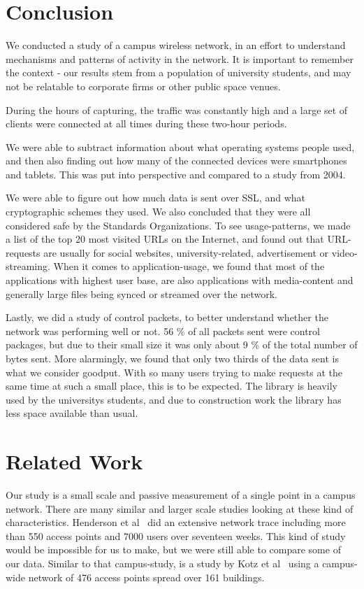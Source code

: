 \documentclass[letterpaper,twocolumn,10pt]{article}
\begin{document}
\section{Conclusion}
We conducted a study of a campus wireless network, in an effort to understand mechanisms and patterns of activity in the network. It is important to remember the context - our results stem from a population of university students, and may not be relatable to corporate firms or other public space venues.

During the hours of capturing, the traffic was constantly high and a large set of clients were connected at all times during these two-hour periods.

We were able to subtract information about what operating systems people used, and then also finding out how many of the connected devices were smartphones and tablets. This was put into perspective and compared to a study from 2004.

We were able to figure out how much data is sent over SSL, and what cryptographic schemes they used. We also concluded that they were all considered safe by the Standards Organizations. To see usage-patterns, we made a list of the top 20 most visited URLs on the Internet, and found out that URL-requests are usually for social websites, university-related, advertisement or video-streaming. When it comes to application-usage, we found that most of the applications with highest user base, are also applications with media-content and generally large files being synced or streamed over the network.

Lastly, we did a study of control packets, to better understand whether the network was performing well or not. 56 \% of all packets sent were control packages, but due to their small size it was only about 9 \% of the total number of bytes sent. More alarmingly, we found that only two thirds of the data sent is what we consider goodput. With so many users trying to make requests at the same time at such a small place, this is to be expected. The library is heavily used by the universitys students, and due to construction work the library has less space available than usual.

\section{Related Work}

Our study is a small scale and passive measurement of a single point in a campus network. There are many similar and larger scale studies looking at these kind of characteristics. Henderson et al~\cite{Campus2004} did an extensive network trace including more than 550 access points and 7000 users over seventeen weeks. This kind of study would be impossible for us to make, but we were still able to compare some of our data. Similar to that campus-study, is a study by Kotz et al~\cite{Campus2002} using a campus-wide network of 476 access points spread over 161 buildings.
\end{document}
